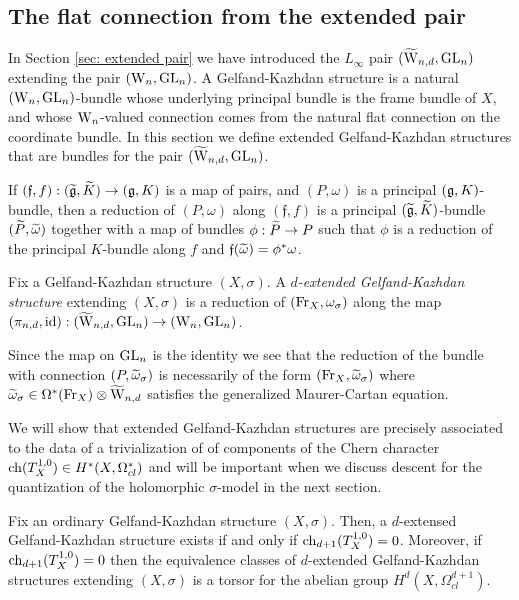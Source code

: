 \documentclass[10pt]{amsart}
\def\brian{\textcolor{blue}{BW: }\textcolor{blue}}
\begin{document}

\subsection{The flat connection from the extended pair}

In Section \ref{sec: extended pair} we have introduced the $L_\infty$ pair $(\TVectd, \GL_n)$ extending the pair $(\Vect, \GL_n)$.
A Gelfand-Kazhdan structure is a natural $(\Vect,\GL_n)$-bundle whose underlying principal bundle is the frame bundle of $X$, and whose $\Vect$-valued connection comes from the natural flat connection on the coordinate bundle. 
In this section we define extended Gelfand-Kazhdan structures that are bundles for the pair $(\TVectd,\GL_n)$.

If $(\mathfrak{f},f) : (\Tilde{\fg},\Tilde{K}) \to (\fg, K)$ is a map of pairs, and $(P,\omega)$ is a principal $(\fg,K)$-bundle, then a reduction of $(P,\omega)$ along $(\mathfrak{f},f)$ is a principal $(\Tilde{\fg}, \Tilde{K})$-bundle $(\Tilde{P}, \Tilde{\omega})$ together with a map of bundles $\phi : \Tilde{P} \to P$ such that $\phi$ is a reduction of the principal $K$-bundle along $f$ and $\mathfrak{f}(\Tilde{\omega}) = \phi^*\omega$.

\begin{dfn}
Fix a Gelfand-Kazhdan structure $(X,\sigma)$.  
A {\em $d$-extended Gelfand-Kazhdan structure} extending $(X,\sigma)$ is a reduction of $(\Fr_X, \omega_{\sigma})$ along the map $(\pi_{n,d}, {\rm id}) : (\TVectd,\GL_n) \to (\Vect, \GL_n)$.
\end{dfn}

Since the map on $\GL_n$ is the identity we see that the reduction of the bundle with connection $(P, \Tilde{\omega}_\sigma)$ is necessarily of the form $(\Fr_X, \Tilde{\omega}_\sigma)$ where $\Tilde{\omega}_\sigma \in \Omega^*(\Fr_X) \tensor \TVectd$ satisfies the generalized Maurer-Cartan equation.

We will show that extended Gelfand-Kazhdan structures are precisely associated to the data of a trivialization of of components of the Chern character $\ch(T_X^{1,0}) \in H^*(X, \Omega^*_{cl})$ and will be important when we discuss descent for the quantization of the holomorphic $\sigma$-model in the next section.

\begin{prop}\label{prop: extended GK}
Fix an ordinary Gelfand-Kazhdan structure $(X,\sigma)$.
Then, a $d$-extensed Gelfand-Kazhdan structure exists if and only if $\ch_{d+1}(T^{1,0}_X) = 0$.
Moreover, if $\ch_{d+1}(T_X^{1,0}) = 0$ then the equivalence classes of $d$-extended Gelfand-Kazhdan structures extending $(X,\sigma)$ is a torsor for the abelian group $H^{d}(X , \Omega^{d+1}_{cl})$.
\end{prop}
\end{document}
